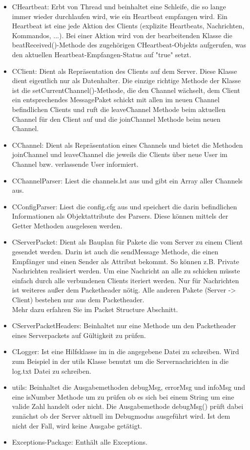 \documentclass[a4paper,12pt]{scrartcl}
\begin{document}
\begin{itemize}
\item CHeartbeat: Erbt von Thread und beinhaltet eine Schleife, die so lange immer wieder durchlaufen wird, wie ein Heartbeat empfangen wird. Ein Heartbeat ist eine jede Aktion des Clients (explizite Heartbeats, Nachrichten, Kommandos, ...). Bei einer Aktion wird von der bearbeitenden Klasse die beatReceived()-Methode des zugehörigen CHeartbeat-Objekts aufgerufen, was den aktuellen Heartbeat-Empfangen-Status auf "true" setzt.
\item CClient: Dient als Repräsentation des Clients auf dem Server. Diese Klasse dient eigentlich nur als Datenhalter. Die einzige richtige Methode der Klasse ist die setCurrentChannel()-Methode, die den Channel wächselt, dem Client ein entsprechendes MessagePaket schickt mit allen im neuen Channel befindlichen Clients und ruft die leaveChannel Methode beim aktuellen Channel für den Client auf und die joinChannel Methode beim neuen Channel.
\item CChannel: Dient als Repräsentation eines Channels und bietet die Methoden joinChannel und leaveChannel die jeweils die Clients über neue User im Channel bzw. verlassende User informiert.
\item CChannelParser: Liest die channels.lst aus und gibt ein Array aller Channels aus.
\item CConfigParser: Liest die config.cfg aus und speichert die darin befindlichen Informationen als Objektattribute des Parsers. Diese können mittels der Getter Methoden ausgelesen werden.
\item CServerPacket: Dient als Bauplan für Pakete die vom Server zu einem Client gesendet werden. Darin ist auch die sendMessage Methode, die einen Empfänger und einen Sender als Attribut bekommt. So können z.B. Private Nachrichten realisiert werden. Um eine Nachricht an alle zu schicken müsste einfach durch alle verbundenen Clients iteriert werden. Nur für Nachrichten ist weiteres außer dem Packetheader nötig. Alle anderen Pakete (Server -> Client) bestehen nur aus dem Packetheader.\\
Mehr dazu erfahren Sie im Packet Structure Abschnitt.
\item CServerPacketHeaders: Beinhaltet nur eine Methode um den Packetheader eines Serverpackets auf Gültigkeit zu prüfen.
\item CLogger: Ist eine Hilfsklasse im in die angegebene Datei zu schreiben. Wird zum Beispiel in der utils Klasse benutzt um die Servernachrichten in die log.txt Datei zu schreiben.
\item utils: Beinhaltet die Ausgabemethoden debugMsg, errorMsg und infoMsg und eine isNumber Methode um zu prüfen ob es sich bei einem String um eine valide Zahl handelt oder nicht. Die Ausgabemethode debugMsg() prüft dabei zunächst ob der Server aktuell im Debugmodus ausgeführt wird. Ist dem nicht der Fall, wird keine Ausgabe getätigt.
\item Exceptions-Package: Enthält alle Exceptions.
\end{itemize}
\end{document}
